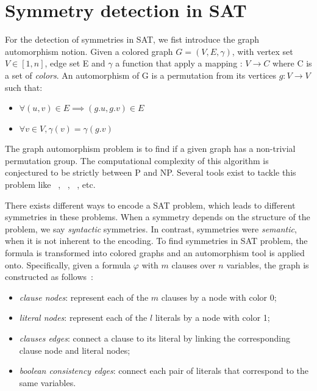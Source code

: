\section{Symmetry detection in SAT}
For the detection of symmetries in SAT, we fist introduce the graph automorphism notion.
Given a colored graph $G = (V, E, \gamma)$, with vertex set $V \in  [1, n] $, edge set E and
$\gamma$ a function that apply a mapping : $V \rightarrow C$ where C is a set of \emph{colors}.
An automorphism of G is a permutation from its vertices $g :V \rightarrow V$ 
such that:
\begin{itemize}
 \item $\forall (u, v) \in E \implies (g.u, g.v) \in E$
 \item $\forall v \in V, \gamma(v) = \gamma(g.v)$
\end{itemize}
The graph automorphism problem is to find if a given graph has a non-trivial permutation group. 
The computational complexity of this algorithm is conjectured to be strictly between P and NP.
Several tools exist to tackle this problem like \saucy~\cite{katebi2010symmetry},
\bliss~\cite{JunttilaKaski:ALENEX2007}, \nauty~\cite{mckay2003nauty}, etc.

There exists different ways to encode a SAT problem,
which leads to different symmetries in these problems.
When a symmetry depends on the structure of the problem, we say \emph{syntactic} symmetries. 
In contrast, symmetries were \emph{semantic}, when it is not inherent to the encoding.
To find symmetries in SAT problem, the formula is transformed into colored graphs
and an automorphism tool is applied onto. Specifically, given a formula $\varphi$ with
$m$ clauses over $n$ variables, the graph is constructed as follows~\cite{biere2009handbook}:
\begin{itemize}
 \item \emph{clause nodes}: represent each of the $m$ clauses by a node with color 0;
 \item \emph{literal nodes}: represent each of the $l$ literals by a node with color 1;
 \item \emph{clauses edges}: connect a clause to its literal by linking the corresponding  clause node and literal nodes;
 \item \emph{boolean consistency edges}: connect each pair of literals that correspond to the same variables.
\end{itemize}

